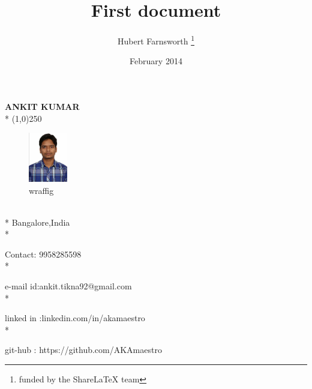 \documentclass[12pt,a4paper,sans]{article}
\title{First document}
\author{Hubert Farnsworth \thanks{funded by the ShareLaTeX team}}
\date{February 2014}
\begin{document}
 	\begin{center}
 		 	\textbf{ANKIT KUMAR}
 		 	\\*
 			\line(1,0){250}
 		 	 	
 	\end{center}
 
 
 \begin{figure}
	\includegraphics[width=0.15\textwidth]{pic}
 	\caption{wraffig}
 	\label{fig:wrapfig}
 \end{figure}
\\*
\left Bangalore,India
\\* 

\left Contact: 9958285598
\\*

\left  e-mail id:ankit.tikna92@gmail.com
\\*

\left linked in :linkedin.com/in/akamaestro
\\*

\left git-hub : https://github.com/AKAmaestro
\end{document}
